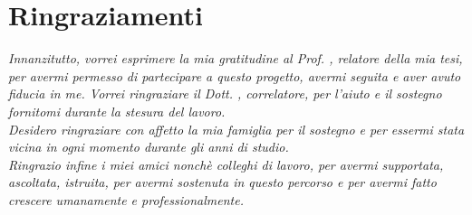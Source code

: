 \cleardoublepage
{}
{}


\bigskip

\begingroup
\let\clearpage\relax
\let\cleardoublepage\relax
\let\cleardoublepage\relax

\chapter*{Ringraziamenti}

\noindent \textit{Innanzitutto, vorrei esprimere la mia gratitudine al Prof. \myProf, relatore della mia tesi, per avermi permesso di partecipare a questo progetto, avermi seguita e aver avuto fiducia in me. Vorrei ringraziare il Dott. \coProf, correlatore, per l'aiuto e il sostegno fornitomi durante la stesura del lavoro.}\\

\noindent \textit{Desidero ringraziare con affetto la mia famiglia per il sostegno e per essermi stata vicina in ogni momento durante gli anni di studio.}\\

\noindent \textit{Ringrazio infine i miei amici nonchè colleghi di lavoro, per avermi supportata, ascoltata, istruita, per avermi sostenuta in questo percorso e per avermi fatto crescere umanamente e professionalmente.}\\
\bigskip


\endgroup
